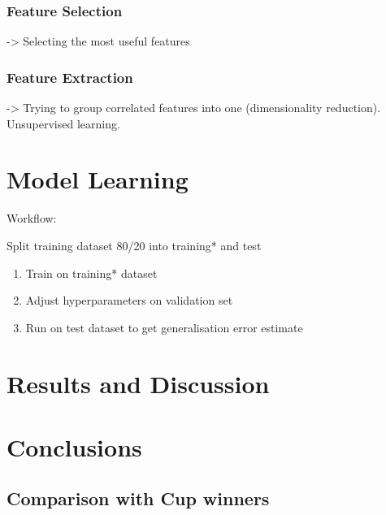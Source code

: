 \documentclass[
  11pt,
  a4paper,
  DIV=12,captions=tableheading,oneside]{scrbook}
\providecommand{\tightlist}{%
  \setlength{\itemsep}{0pt}\setlength{\parskip}{0pt}}
\providecommand{\tightlist}{%
  \setlength{\itemsep}{0pt}\setlength{\parskip}{0pt}}
\begin{document}
\hypertarget{feature-selection-1}{%
\subsection{Feature Selection}\label{feature-selection-1}}

-\textgreater{} Selecting the most useful features

\hypertarget{feature-extraction}{%
\subsection{Feature Extraction}\label{feature-extraction}}

-\textgreater{} Trying to group correlated features into one (dimensionality reduction). Unsupervised learning.

\hypertarget{model-learning}{%
\chapter{Model Learning}\label{model-learning}}

Workflow:

Split training dataset 80/20 into training* and test

\begin{enumerate}
\def\labelenumi{\arabic{enumi}.}
\tightlist
\item
  Train on training* dataset
\item
  Adjust hyperparameters on validation set
\item
  Run on test dataset to get generalisation error estimate
\end{enumerate}

\hypertarget{results-and-discussion}{%
\chapter{Results and Discussion}\label{results-and-discussion}}

\hypertarget{conclusions}{%
\chapter{Conclusions}\label{conclusions}}

\hypertarget{comparison-with-cup-winners}{%
\section{Comparison with Cup winners}\label{comparison-with-cup-winners}}
\end{document}

